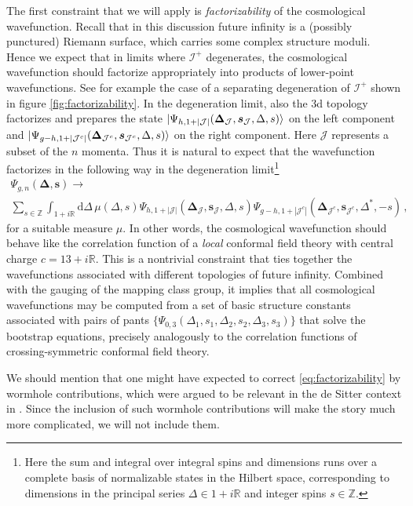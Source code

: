 \documentclass[12pt,a4paper]{article}
\renewcommand\d{\text{d}}
\begin{document}
The first constraint that we will apply is \emph{factorizability} of the cosmological wavefunction. Recall that in this discussion future infinity is a (possibly punctured) Riemann surface, which carries some complex structure moduli. Hence we expect that in limits where $\mathcal{I}^+$ degenerates, the cosmological wavefunction should factorize appropriately into products of lower-point wavefunctions. See for example the case of a separating degeneration of $\mathcal{I}^+$ shown in figure \ref{fig:factorizability}. In the degeneration limit, also the 3d topology factorizes and prepares the state $\ket{\Psi_{h,1+|\mathcal{J}|}(\boldsymbol{\Delta}_\mathcal{J},\boldsymbol{s}_\mathcal{J},\Delta,s)}$ on the left component and $\ket{\Psi_{g-h,1+|\mathcal{J}^c|}(\boldsymbol{\Delta}_{\mathcal{J}^c},\boldsymbol{s}_{\mathcal{J}^c},\Delta,s)}$ on the right component. Here $\mathcal{J}$ represents a subset of the $n$ momenta. Thus it is natural to expect that the wavefunction factorizes in the following way in the degeneration limit\footnote{Here the sum and integral over integral spins and dimensions runs over a complete basis of normalizable states in the Hilbert space, corresponding to dimensions in the principal series $\Delta\in 1+i\mathbb{R}$ and integer spins $s\in\mathbb{Z}$.} 
\begin{multline}
    \Psi_{g,n}(\boldsymbol{\Delta},\boldsymbol{s}) \to \\
    \sum_{s\in\mathbb{Z}} \int_{1+i\mathbb{R}}\d \Delta\, \mu(\Delta,s) \Psi_{h,1+|\mathcal{J}|}(\boldsymbol{\Delta}_\mathcal{J},\boldsymbol{s}_\mathcal{J},\Delta,s)\Psi_{g-h,1+|\mathcal{J}^c|}(\boldsymbol{\Delta}_{\mathcal{J}^c},\boldsymbol{s}_{\mathcal{J}^c},\Delta^*,-s)\, ,\label{eq:factorizability}
\end{multline}
for a suitable measure $\mu$.
In other words, the cosmological wavefunction should behave like the correlation function of a \emph{local} conformal field theory with central charge $ c= 13 + i \mathbb{R}$. This is a nontrivial constraint that ties together the wavefunctions associated with different topologies of future infinity. Combined with the gauging of the mapping class group, it implies that all cosmological wavefunctions may be computed from a set of basic structure constants associated with pairs of pants $\{\Psi_{0,3}(\Delta_1,s_1,\Delta_2,s_2,\Delta_3,s_3)\}$ that solve the bootstrap equations, precisely analogously to the correlation functions of crossing-symmetric conformal field theory.

We should mention that one might have expected to correct \eqref{eq:factorizability} by wormhole contributions, which were argued to be relevant in the de Sitter context in \cite{Chen:2020tes}. Since the inclusion of such wormhole contributions will make the story much more complicated, we will not include them.
\end{document}
